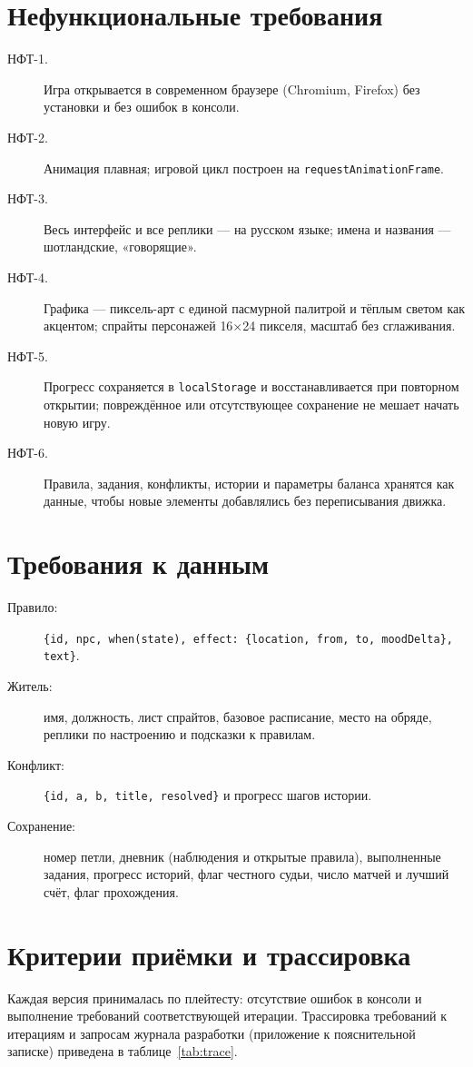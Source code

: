 \documentclass[12pt]{article}
\begin{document}
\section{Нефункциональные требования}
\begin{description}
\item[НФТ-1.] Игра открывается в современном браузере (Chromium, Firefox) без установки и без ошибок в консоли.
\item[НФТ-2.] Анимация плавная; игровой цикл построен на \texttt{requestAnimationFrame}.
\item[НФТ-3.] Весь интерфейс и все реплики — на русском языке; имена и названия — шотландские, «говорящие».
\item[НФТ-4.] Графика — пиксель-арт с единой пасмурной палитрой и тёплым светом как акцентом; спрайты персонажей 16×24 пикселя, масштаб без сглаживания.
\item[НФТ-5.] Прогресс сохраняется в \texttt{localStorage} и восстанавливается при повторном открытии; повреждённое или отсутствующее сохранение не мешает начать новую игру.
\item[НФТ-6.] Правила, задания, конфликты, истории и параметры баланса хранятся как данные, чтобы новые элементы добавлялись без переписывания движка.
\end{description}

\section{Требования к данным}
\begin{description}
\item[Правило:] \texttt{\{id, npc, when(state), effect: \{location, from, to, moodDelta\}, text\}}.
\item[Житель:] имя, должность, лист спрайтов, базовое расписание, место на обряде, реплики по настроению и подсказки к правилам.
\item[Конфликт:] \texttt{\{id, a, b, title, resolved\}} и прогресс шагов истории.
\item[Сохранение:] номер петли, дневник (наблюдения и открытые правила), выполненные задания, прогресс историй, флаг честного судьи, число матчей и лучший счёт, флаг прохождения.
\end{description}

\section{Критерии приёмки и трассировка}
Каждая версия принималась по плейтесту: отсутствие ошибок в консоли и выполнение требований соответствующей итерации. Трассировка требований к итерациям и запросам журнала разработки (приложение к пояснительной записке) приведена в таблице~\ref{tab:trace}.
\end{document}

